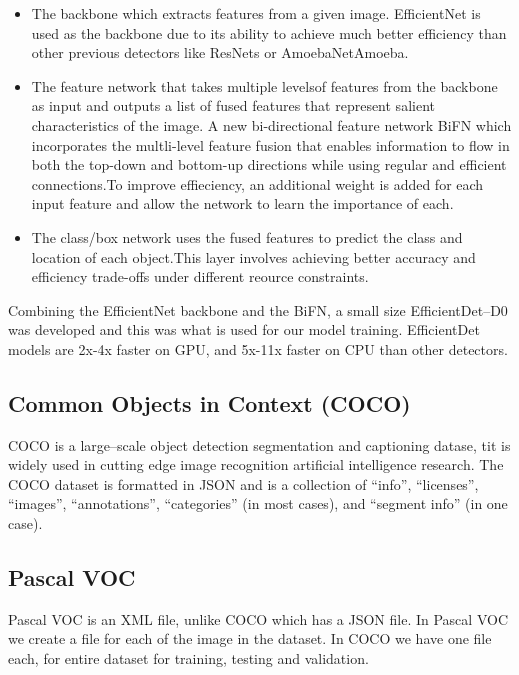 \documentclass[12pt]{report}
\begin{document}
\begin{itemize}[topsep=0pt]

\item The backbone which extracts features from a given image. EfficientNet is used as the backbone due to its ability to achieve much better efficiency than other previous detectors like ResNets\cite{Res} or AmoebaNet{Amoeba}.

\item The feature network that takes multiple levelsof features from the backbone as input and outputs a list of fused features that represent salient characteristics of the image. A new bi-directional feature network BiFN which incorporates the multli-level feature fusion that enables information to flow in both the top-down and bottom-up directions while using regular and efficient connections.To improve effieciency, an additional weight is added for each input feature and allow the network to learn the importance of each.
 
\item The class/box network uses the fused features to predict the class and location of each object.This layer involves achieving better accuracy and efficiency trade-offs under different reource constraints.

\end{itemize}

Combining the EfficientNet backbone and the BiFN, a small size EfficientDet--D0 was developed and this was what is used for our model training.
EfficientDet models are 2x-4x faster on GPU, and 5x-11x faster on CPU than other detectors\cite{Efficientdet}.

\subsection{Common Objects in Context (COCO)}
COCO is a large--scale object detection segmentation and captioning datase, tit is widely used in cutting edge image recognition artificial intelligence research.
The COCO dataset is formatted in JSON and is a collection of “info”, “licenses”, “images”, “annotations”, “categories” (in most cases), and “segment info” (in one case)\cite{COCO}.

\subsection{Pascal VOC}
Pascal VOC is an XML file, unlike COCO which has a JSON file. In Pascal VOC we create a file for each of the image in the dataset. In COCO we have one file each, for entire dataset for training, testing and validation\cite{VOC}.
\end{document}
